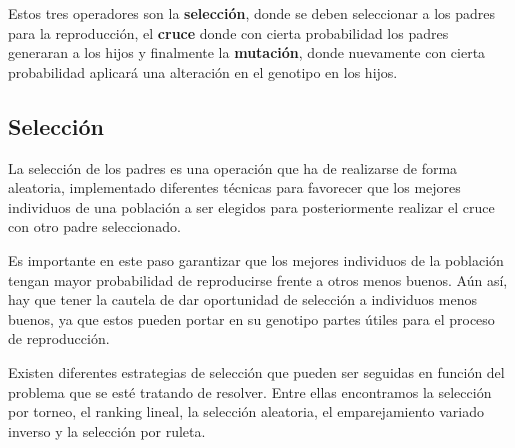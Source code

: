 Estos tres operadores son la \textbf{selección}, donde se deben seleccionar a los padres para la reproducción, el \textbf{cruce} donde con cierta probabilidad los padres generaran a los hijos y finalmente la \textbf{mutación}, donde nuevamente con cierta probabilidad aplicará una alteración en el genotipo en los hijos.

\subsection{Selección}

La selección de los padres es una operación que ha de realizarse de forma aleatoria, implementado diferentes técnicas para favorecer que los mejores individuos de una población a ser elegidos para posteriormente realizar el cruce con otro padre seleccionado.

Es importante en este paso garantizar que los mejores individuos de la población tengan mayor probabilidad de reproducirse frente a otros menos buenos. Aún así, hay que tener la cautela de dar oportunidad de selección a individuos menos buenos, ya que estos pueden portar en su genotipo partes útiles para el proceso de reproducción.

Existen diferentes estrategias de selección que pueden ser seguidas en función del problema que se esté tratando de resolver. Entre ellas encontramos la selección por torneo, el ranking lineal, la selección aleatoria, el emparejamiento variado inverso y la selección por ruleta.

